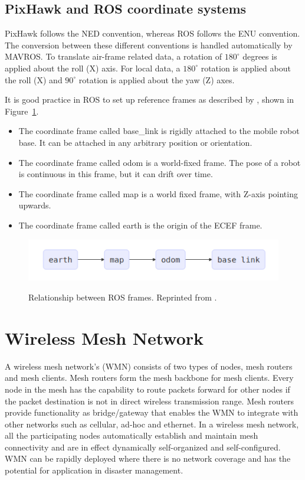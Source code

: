 \subsection{PixHawk and ROS coordinate systems}

PixHawk follows the NED convention, whereas ROS follows the ENU convention. The conversion between these different conventions is handled automatically by MAVROS. To translate air-frame related data, a rotation of $180^{\circ}$ degrees is applied about the roll (X) axis. For local data, a $180^{\circ}$ rotation is applied about the roll (X) and $90^{\circ}$ rotation is applied about the yaw (Z) axes.

It is good practice in ROS to set up reference frames as described by , shown in Figure~\ref{fig:rosrefframes}.

\begin{itemize}
	\item The coordinate frame called base\_link is rigidly attached to the mobile robot base. It can be attached in any arbitrary position or orientation.
	\item The coordinate frame called odom is a world-fixed frame. The pose of a robot is continuous in this frame, but it can drift over time.
	\item The coordinate frame called map is a world fixed frame, with Z-axis pointing upwards. 
	\item The coordinate frame called earth is the origin of the ECEF frame.
\end{itemize}

\begin{figure}
	\centering
	\caption[Relation between ROS frames]{\small 
		Relationship between ROS frames. Reprinted from . }
	\includegraphics[width=5in]{figures/literature/ros_rel_frames}
	\label{fig:rosrefframes}
\end{figure}

\section{Wireless Mesh Network}

A wireless mesh network's (WMN) consists of two types of nodes, mesh routers and mesh clients. Mesh routers form the mesh backbone for mesh clients. Every node in the mesh has the capability to route packets forward for other nodes if the packet destination is not in direct wireless transmission range. Mesh routers provide functionality as bridge/gateway that enables the WMN to integrate with other networks such as cellular, ad-hoc and ethernet. In a wireless mesh network, all the participating nodes automatically establish and maintain mesh connectivity and are in effect dynamically self-organized and self-configured. WMN can be rapidly deployed where there is no network coverage and has the potential for application in disaster management.

